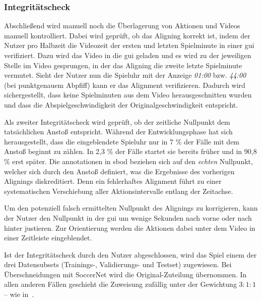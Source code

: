 %



\subsubsection{Integritätscheck}

Abschließend wird manuell noch die Überlagerung von Aktionen und Videos manuell kontrolliert.
Dabei wird geprüft, ob das Aligning korrekt ist, indem der Nutzer pro Halbzeit die Videozeit der ersten und letzten Spielminute in einer \gls{gui} verifiziert.
Dazu wird das Video in die \gls{gui} geladen und es wird zu der jeweiligen Stelle im Video gesprungen, in der das Aligning die zweite \bzw letzte Spielminute vermutet.
Sieht der Nutzer nun \zB die Spieluhr mit der Anzeige \emph{01:00} bzw. \emph{44:00} (bei punktgenauem Abpfiff) kann er das Alignment verifizieren.
Dadurch wird sichergestellt, dass keine Spielminuten aus dem Video herausgeschnitten wurden und dass die Abspielgeschwindigkeit der Originalgeschwindigkeit entspricht.

Als zweiter Integritätscheck wird geprüft, ob der zeitliche Nullpunkt dem tatsächlichen Anstoß entspricht.
Während der Entwicklungsphase hat sich herausgestellt, dass die eingeblendete Spieluhr nur in 7 \% der Fälle mit dem Anstoß beginnt zu zählen.
In 2,3 \% der Fälle startet sie bereits früher und in 90,8 \% erst später.
Die \gls{annotationen} in \gls{sbod} beziehen sich auf den \emph{echten} Nullpunkt, welcher sich durch den Anstoß definiert, was die Ergebnisse des vorherigen Alignings diskreditiert.
Denn ein fehlerhaftes Alignment führt zu einer systematischen Verschiebung aller Aktionsintervalle entlang der Zeitachse.

Um den potenziell falsch ermittelten Nullpunkt des Alignings zu korrigieren, kann der Nutzer den Nullpunkt in der \gls{gui} um wenige Sekunden nach vorne oder nach hinter justieren.
Zur Orientierung werden die Aktionen dabei unter dem Video in einer Zeitleiste eingeblendet.

Ist der Integritätscheck durch den Nutzer abgeschlossen, wird das Spiel einem der drei Datensubsets (Trainings-, Validierungs- und Testset) zugewiesen.
Bei Überschneidungen mit SoccerNet wird die Original-Zuteilung übernommen.
In allen anderen Fällen geschieht die Zuweisung zufällig unter der Gewichtung $3:1:1$ -- wie in~\cite{Giancola18}.


